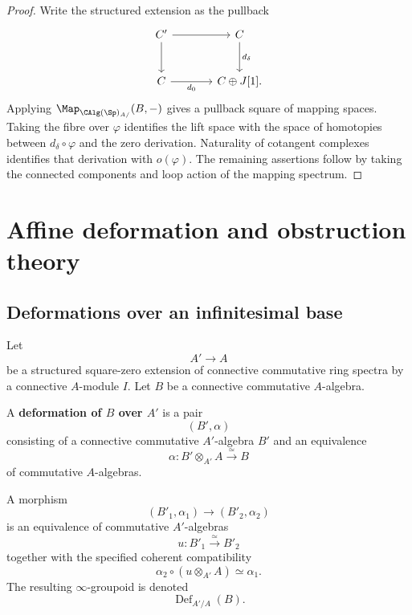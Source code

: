 \begin{proof}
Write the structured extension as the pullback
\[
\begin{tikzcd}[column sep=large, row sep=large]
    C'
        \arrow[r]
        \arrow[d]
    &
    C
        \arrow[d, "d_\delta"]
    \\
    C
        \arrow[r, "d_0"']
    &
    C\oplus J[1].
\end{tikzcd}
\]
Applying $\Map_{\CAlg(\Sp)_{A/}}(B,-)$ gives a pullback square of
mapping spaces. Taking the fibre over $\varphi$ identifies the lift space
with the space of homotopies between $d_\delta\circ\varphi$ and the zero
derivation. Naturality of cotangent complexes identifies that derivation
with $o(\varphi)$. The remaining assertions follow by taking the
connected components and loop action of the mapping spectrum.
\end{proof}

\section{Affine deformation and obstruction theory}
\label{sec:affine-spectral-deformation-theory}

\subsection{Deformations over an infinitesimal base}

\begin{definition}
\label{def:affine-deformation-square-zero}
Let
\[
    A'
    \longrightarrow
    A
\]
be a structured square-zero extension of connective commutative ring
spectra by a connective \(A\)-module \(I\). Let \(B\) be a connective
commutative \(A\)-algebra.

A \textbf{deformation of \(B\) over \(A'\)} is a pair
\[
    (B',\alpha)
\]
consisting of a connective commutative \(A'\)-algebra \(B'\) and an
equivalence
\[
    \alpha
    \colon
    B'\otimes_{A'}A
    \xrightarrow{\simeq}
    B
\]
of commutative \(A\)-algebras.

A morphism
\[
    (B'_1,\alpha_1)
    \longrightarrow
    (B'_2,\alpha_2)
\]
is an equivalence of commutative \(A'\)-algebras
\[
    u
    \colon
    B'_1
    \xrightarrow{\simeq}
    B'_2
\]
together with the specified coherent compatibility
\[
    \alpha_2
    \circ
    (u\otimes_{A'}A)
    \simeq
    \alpha_1.
\]
The resulting \(\infty\)-groupoid is denoted
\[
    \operatorname{Def}_{A'/A}(B).
\]
\end{definition}

